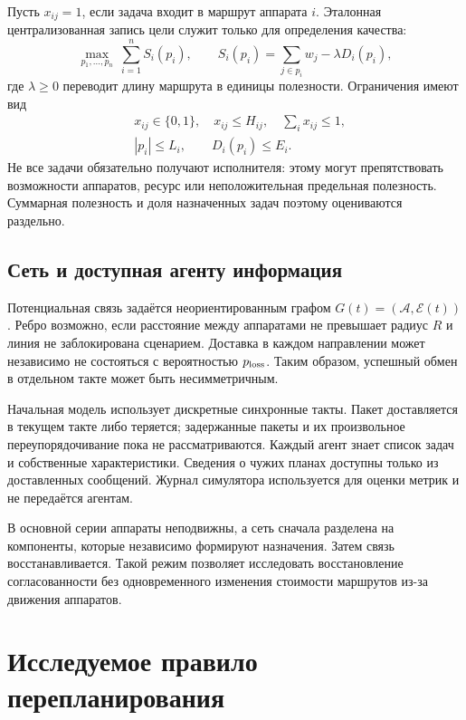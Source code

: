\documentclass{misisarticle}
\begin{document}
Пусть $x_{ij}=1$, если задача входит в маршрут аппарата $i$. Эталонная централизованная запись цели служит только для определения качества:
\begin{equation}
 \max_{p_1,\ldots,p_n}\ \sum_{i=1}^{n} S_i(p_i),\qquad
 S_i(p_i)=\sum_{j\in p_i} w_j-\lambda D_i(p_i),
\end{equation}
где $\lambda\geq0$ переводит длину маршрута в единицы полезности. Ограничения имеют вид
\begin{equation}
\begin{aligned}
 &x_{ij}\in\{0,1\},\quad x_{ij}\leq H_{ij},\quad
 \sum_i x_{ij}\leq1,\\
 &|p_i|\leq L_i,\qquad D_i(p_i)\leq E_i.
\end{aligned}
\end{equation}
Не все задачи обязательно получают исполнителя: этому могут препятствовать возможности аппаратов, ресурс или неположительная предельная полезность. Суммарная полезность и доля назначенных задач поэтому оцениваются раздельно.

\subsection{Сеть и доступная агенту информация}

Потенциальная связь задаётся неориентированным графом $G(t)=(\mathcal A,\mathcal E(t))$. Ребро возможно, если расстояние между аппаратами не превышает радиус $R$ и линия не заблокирована сценарием. Доставка в каждом направлении может независимо не состояться с вероятностью $p_{\rm loss}$. Таким образом, успешный обмен в отдельном такте может быть несимметричным.

Начальная модель использует дискретные синхронные такты. Пакет доставляется в текущем такте либо теряется; задержанные пакеты и их произвольное переупорядочивание пока не рассматриваются. Каждый агент знает список задач и собственные характеристики. Сведения о чужих планах доступны только из доставленных сообщений. Журнал симулятора используется для оценки метрик и не передаётся агентам.

В основной серии аппараты неподвижны, а сеть сначала разделена на компоненты, которые независимо формируют назначения. Затем связь восстанавливается. Такой режим позволяет исследовать восстановление согласованности без одновременного изменения стоимости маршрутов из-за движения аппаратов.

\section{Исследуемое правило перепланирования}
\end{document}
